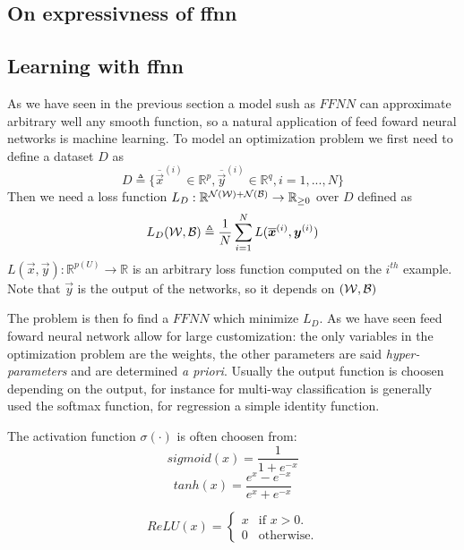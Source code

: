 \subsection{On expressivness of ffnn}
\subsection{Learning with ffnn}

As we have seen in the previous section a model sush as $FFNN$ can approximate arbitrary well any smooth function, so a natural application of feed foward neural networks is machine learning.
To model an optimization problem we first need to define a dataset $D$ as 
\begin{equation}
D\triangleq\{\overline{\vec{x}}^{(i)} \in \mathbb{R}^p, \overline{\vec{y}}^{(i)} \in \mathbb{R}^q,  i=1,...,N\}
\end{equation}
Then we need a loss function $L_D:\mathbb{R}^{\mathcal{N}(\mathcal{W})+\mathcal{N}(\mathcal{B})} \rightarrow \mathbb{R}_{\geq 0}$ over $D$ defined as
\begin{equation}
L_D(\mathcal{W},\mathcal{B})\triangleq\frac{1}{N}\sum_{i=1}^N L(\overline{\boldsymbol{x}}^{(i)},\boldsymbol{y}^{(i)}) 
\end{equation}
$L(\vec{x},\vec{y}):\mathbb{R}^{p(U)} \rightarrow \mathbb{R}$ is an arbitrary loss function computed on the $i^{th}$ example. Note that $\vec{y}$ is the output of the
networks, so it depends on $(\mathcal{W},\mathcal{B})$


The problem is then fo find a $FFNN$ which minimize $L_D$. As we have seen feed foward neural network allow for large customization: the only variables in the optimization problem are the weights, the other
parameters are said \textit{hyper-parameters} and are determined \textit{a priori}. Usually the output function is choosen depending on the output, for instance for multi-way classification
is generally used the softmax function, for regression a simple identity function.

The activation function $\sigma(\cdot)$ is often choosen from:
\begin{equation}
 sigmoid(x)=\frac{1}{1+e^{-x}}
\end{equation}
\begin{equation}
 tanh(x)=\frac{e^x-e^{-x}}{e^x+e^{-x}}
\end{equation}

\begin{equation}
  ReLU(x)=\begin{cases}
    x & \text{if $x>0$}.\\
    0 & \text{otherwise}.
  \end{cases}
\end{equation}

